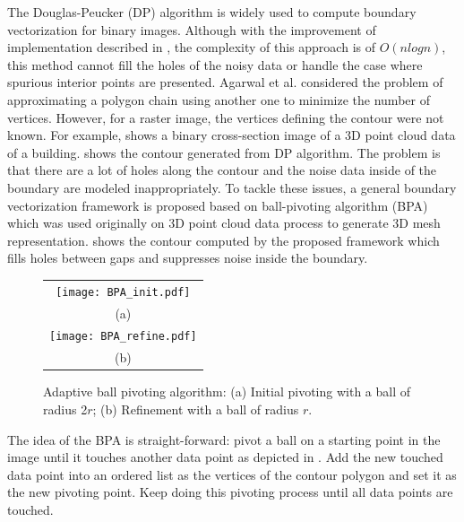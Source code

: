 The Douglas-Peucker (DP) algorithm \cite{DP_DP} is widely used
to compute boundary vectorization for binary images.
Although  with the improvement of implementation described in \cite{DP_HS, DP_HS94},
the complexity of this approach is of $O(nlogn)$, this method cannot fill the
holes of the noisy data or handle the case
where spurious interior points are presented.
Agarwal et al. \cite{DP_AV} considered the problem of
approximating a polygon chain using another one to minimize the number of
vertices. However, for a raster image, the vertices
defining the contour were not known.
For example,  shows a binary cross-section
image of a 3D point cloud data of a building.  shows
the contour generated from DP algorithm. The problem is that there are
a lot of holes along the contour and the noise data inside of the
boundary are modeled inappropriately.
To tackle these issues, a general boundary vectorization framework is proposed
based on ball-pivoting algorithm (BPA) \cite{BPA_BMRS} which was used
originally on 3D point cloud data process to generate 3D mesh representation.
 shows
the contour computed by the proposed framework which fills holes between gaps
and suppresses noise inside the boundary.


\begin{figure}[hbtp]
\begin{center}
\begin{tabular}{c}
\texttt{[image: BPA\_init.pdf]} \\
(a) \\
\texttt{[image: BPA\_refine.pdf]} \\
(b)
\end{tabular}
\end{center}
\caption{Adaptive ball pivoting algorithm:
(a) Initial pivoting with a ball of radius 2$r$;
(b) Refinement with a ball of radius $r$.}
\label{fig:BPA}
\end{figure}


The idea of the BPA is straight-forward:
pivot a ball on a starting point in the image
until it touches another data point as depicted in .
Add the new touched
data point into an ordered list as the vertices of the contour polygon and
set it as the new pivoting point.
Keep doing this pivoting process until all data points are touched.

